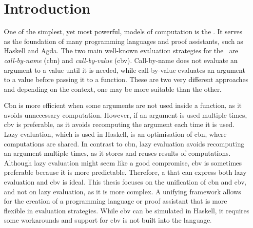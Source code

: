 \chapter{Introduction}\label{introduction}




One of the simplest, yet most powerful, models of computation is the \lc.  
It serves as the foundation of many programming languages and proof assistants, such as Haskell and Agda.
The two main well-known evaluation strategies for the \lc\ are \emph{call-by-name} (\textsf{cbn}) and \emph{call-by-value} (\textsf{cbv}). 
Call-by-name does not evaluate an argument to a value until it is needed, while call-by-value evaluates an argument to a value before passing it to a function.
These are two very different approaches and depending on the context, one may be more suitable than the other.

\textsf{Cbn} is more efficient when some arguments are not used inside a function, as it avoids unnecessary computation.
However, if an argument is used multiple times, \textsf{cbv} is preferable, as it avoids recomputing the argument each time it is used.
Lazy evaluation, which is used in Haskell, is an optimisation of \textsf{cbn}, where computations are shared.
In contrast to \textsf{cbn}, lazy evaluation avoids recomputing an argument multiple times, as it stores and reuses results of computations.
Although lazy evaluation might seem like a good compromise, \textsf{cbv} is sometimes preferable because it is more predictable. 
Therefore, a \lc that can express both lazy evaluation and \textsf{cbv} is ideal. 
This thesis focuses on the unification of \textsf{cbn} and \textsf{cbv}, and not on lazy evaluation, as it is more complex.
A unifying framework allows for the creation of a programming language or proof assistant that is more flexible in evaluation strategies.
While \textsf{cbv} can be simulated in Haskell, it requires some workarounds and support for \textsf{cbv} is not built into the language.  

